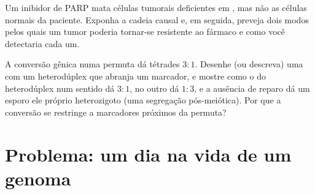 \begin{exercise}[$\star\star\star$]\label{exo:b3:dna-repair:11}
Um inibidor de PARP mata células tumorais deficientes em \emph{},
mas não as células normais da paciente. Exponha a cadeia causal e, em
seguida, preveja dois modos pelos quais um tumor poderia tornar-se
resistente ao fármaco e como você detectaria cada um.
\end{exercise}

\begin{exercise}[$\star\star\star$]\label{exo:b3:dna-repair:12}
A conversão gênica numa permuta dá tétrades $3{:}1$. Desenhe (ou
descreva) uma  com um heterodúplex que abranja um
marcador, e mostre como o  do heterodúplex num
sentido dá $3{:}1$, no outro dá $1{:}3$, e a ausência de reparo dá um
esporo ele próprio heterozigoto (uma segregação pós-meiótica). Por que
a conversão se restringe a marcadores próximos da permuta?
\end{exercise}

\section{Problema: um dia na vida de um genoma}

